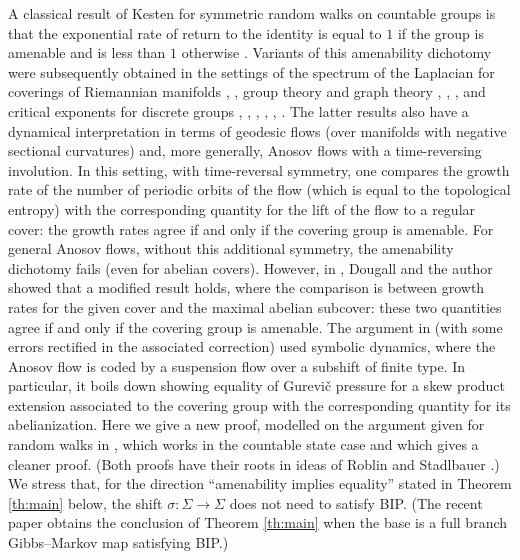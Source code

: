 \documentclass[11pt,letterpaper]{amsart}
\theoremstyle{definition}
\numberwithin{equation}{section}
\numberwithin{theorem}{section}
\begin{document}
A classical result of Kesten for symmetric random walks on countable groups is that the exponential rate of 
return to the identity is equal to $1$ if the group is amenable and is less than $1$ otherwise \cite{Kesten}.
Variants of this amenability dichotomy were subsequently obtained in the settings of 
the spectrum of the Laplacian for coverings of Riemannian manifolds
\cite{Brooks1981}, \cite{Brooks1985}, group theory and graph theory  
\cite{Cohen1982}, \cite{Grigorchuk1980}, \cite{Northshield1992}, \cite{Northshield2004}
and critical exponents for discrete groups \cite{CDS},
\cite{CDST}, \cite{Dougall2019}, \cite{DougallSharp2016}, \cite{Roblin}, \cite{Stadlbauer2013}.
The latter results also have a dynamical interpretation in terms of geodesic flows
(over manifolds with negative sectional curvatures) and, more generally, Anosov flows with a time-reversing 
involution.  In this setting, with time-reversal symmetry, one compares the growth rate of the number of periodic orbits 
of the flow (which is equal to the topological entropy) with the corresponding quantity for the lift of
the flow to a regular cover: the growth rates agree if and only if the covering group is amenable.
For general Anosov flows, without this additional symmetry, the amenability dichotomy fails (even for abelian covers).
However, in \cite{DougallSharp2021}, Dougall and the author showed that a modified result holds, where the comparison is between growth rates for the given cover and the maximal abelian subcover:
these two quantities agree if and only if the covering group is amenable.
The argument in \cite{DougallSharp2021} (with some errors rectified in the associated correction)
used symbolic dynamics, where the Anosov flow is 
coded by a suspension flow over a subshift of finite type. In particular, it boils down showing equality of Gurevi\v{c} 
pressure for a skew product extension associated to the covering group with the corresponding quantity for its abelianization.
Here we give a new proof, modelled on the argument given for random walks 
in \cite{DougallSharp2024}, which works in the countable state case and which gives a cleaner proof.
(Both proofs have their roots in ideas of Roblin \cite{Roblin} and Stadlbauer \cite{Stadlbauer2019}.)
We stress that, for the direction ``amenability implies equality''
stated in Theorem \ref{th:main} below, the shift $\sigma : \Sigma \to \Sigma$ does not need to satisfy BIP.
(The recent paper \cite{GomezTerhesiu2025} obtains the conclusion of Theorem \ref{th:main} when the base is a full branch Gibbs--Markov map satisfying BIP.)
\end{document}
